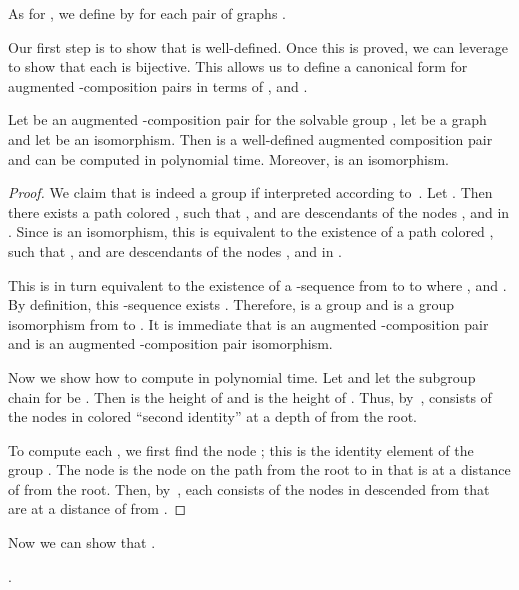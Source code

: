 As for , we define  by  for each pair of graphs .

Our first step is to show that  is well-defined.  Once this is proved, we can leverage  to show that each  is bijective.  This allows us to define a canonical form for augmented -composition pairs in terms of ,  and .

\begin{lemma}
  \label{lem:Y-well-def}
  Let  be an augmented -composition pair for the solvable group , let  be a graph and let  be an isomorphism.  Then  is a well-defined augmented composition pair and can be computed in polynomial time.  Moreover,  is an isomorphism.
\end{lemma}

\begin{proof}
  We claim that  is indeed a group if interpreted according to~.  Let .  Then  \ifft there exists a path  colored , such that ,  and  are descendants of the nodes ,  and  in .  Since  is an isomorphism, this is equivalent to the existence of a path  colored , such that ,  and  are descendants of the nodes ,  and  in .

  This is in turn equivalent to the existence of a -sequence from  to  to  where ,  and .  By definition, this -sequence exists \ifft .  Therefore,  is a group and  is a group isomorphism from  to .  It is immediate that  is an augmented -composition pair and  is an augmented -composition pair isomorphism.

  Now we show how to compute  in polynomial time.  Let  and let the subgroup chain for  be .  Then  is the height of  and  is the height of .  Thus, by~,  consists of the nodes in  colored ``second identity'' at a depth of  from the root.

  To compute each , we first find the node ; this is the identity element of the group .  The node  is the node on the path from the root to  in  that is at a distance of  from the root.  Then, by~, each  consists of the nodes in  descended from  that are at a distance of  from .
\end{proof}

Now we can show that .

\begin{theorem}
  \label{thm:Y-fff}
  .
\end{theorem}

